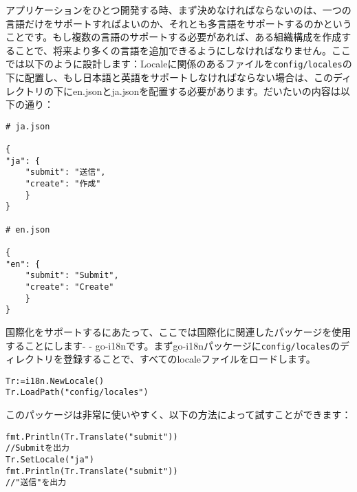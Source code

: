 アプリケーションをひとつ開発する時、まず決めなければならないのは、一つの言語だけをサポートすればよいのか、それとも多言語をサポートするのかということです。もし複数の言語のサポートする必要があれば、ある組織構成を作成することで、将来より多くの言語を追加できるようにしなければなりません。ここでは以下のように設計します：Localeに関係のあるファイルを\texttt{config/locales}の下に配置し、もし日本語と英語をサポートしなければならない場合は、このディレクトリの下にen.jsonとja.jsonを配置する必要があります。だいたいの内容は以下の通り：

\begin{lstlisting}[numbers=none]
# ja.json

{
"ja": {
    "submit": "送信",
    "create": "作成"
    }
}

# en.json

{
"en": {
    "submit": "Submit",
    "create": "Create"
    }
}
\end{lstlisting}

国際化をサポートするにあたって、ここでは国際化に関連したパッケージを使用することにします- - go-i18nです。まずgo-i18nパッケージに\texttt{config/locales}のディレクトリを登録することで、すべてのlocaleファイルをロードします。

\begin{lstlisting}[numbers=none]
Tr:=i18n.NewLocale()
Tr.LoadPath("config/locales")
\end{lstlisting}

このパッケージは非常に使いやすく、以下の方法によって試すことができます：

\begin{lstlisting}[numbers=none]
fmt.Println(Tr.Translate("submit"))
//Submitを出力
Tr.SetLocale("ja")
fmt.Println(Tr.Translate("submit"))
//"送信"を出力
\end{lstlisting}



